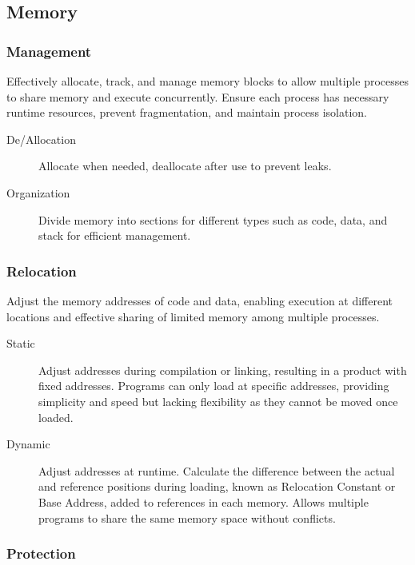 \documentclass[11pt,journal,compsoc]{IEEEtran}
\begin{document}
\subsection{Memory}


\subsubsection{Management}

Effectively allocate, track, and manage memory blocks to allow multiple processes to share memory and execute concurrently. Ensure each process has necessary runtime resources, prevent fragmentation, and maintain process isolation.

\begin{description}
    \item[De/Allocation] Allocate when needed, deallocate after use to prevent leaks.
    
    \item[Organization] Divide memory into sections for different types such as code, data, and stack for efficient management.
\end{description}


\subsubsection{Relocation}

Adjust the memory addresses of code and data, enabling execution at different locations and effective sharing of limited memory among multiple processes.

\begin{description}
    \item[Static] Adjust addresses during compilation or linking, resulting in a product with fixed addresses. Programs can only load at specific addresses, providing simplicity and speed but lacking flexibility as they cannot be moved once loaded.
    
    \item[Dynamic] Adjust addresses at runtime. Calculate the difference between the actual and reference positions during loading, known as Relocation Constant or Base Address, added to references in each memory. Allows multiple programs to share the same memory space without conflicts.
\end{description}


\subsubsection{Protection}
\end{document}
